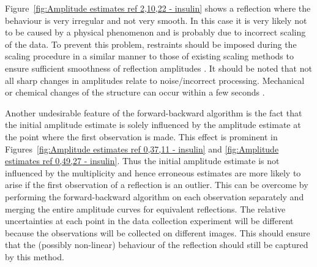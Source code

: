 Figure~\ref{fig:Amplitude estimates ref 2,10,22 - insulin} shows a reflection where the behaviour is very irregular and not very smooth.
In this case it is very likely not to be caused by a physical phenomenon and is probably due to incorrect scaling of the data.
To prevent this problem, restraints should be imposed during the scaling procedure in a similar manner to those of existing scaling methods to ensure sufficient smoothness of reflection amplitudes \cite{evans2013,kabsch2010integration}.
It should be noted that not all sharp changes in amplitudes relate to noise/incorrect processing.
Mechanical or chemical changes of the structure can occur within a few seconds \cite{allan2012}.

Another undesirable feature of the forward-backward algorithm is the fact that the initial amplitude estimate is solely influenced by the amplitude estimate at the point where the first observation is made.
This effect is prominent in Figures~\ref{fig:Amplitude estimates ref 0,37,11 - insulin} and \ref{fig:Amplitude estimates ref 0,49,27 - insulin}.
Thus the initial amplitude estimate is not influenced by the multiplicity and hence erroneous estimates are more likely to arise if the first observation of a reflection is an outlier.
This can be overcome by performing the forward-backward algorithm on each observation separately and merging the entire amplitude curves for equivalent reflections.
The relative uncertainties at each point in the data collection experiment will be different because the observations will be collected on different images.
This should ensure that the (possibly non-linear) behaviour of the reflection should still be captured by this method.
